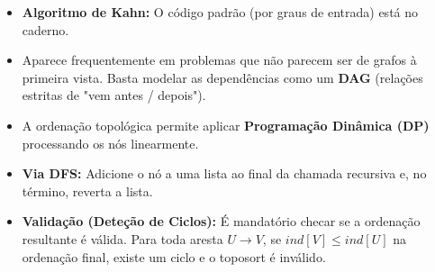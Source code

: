 \begin{itemize}
    \item \textbf{Algoritmo de Kahn:} O código padrão (por graus de entrada) está no caderno.
    \item Aparece frequentemente em problemas que não parecem ser de grafos à primeira vista. Basta modelar as dependências como um \textbf{DAG} (relações estritas de "vem antes / depois").
    \item A ordenação topológica permite aplicar \textbf{Programação Dinâmica (DP)} processando os nós linearmente.
    \item \textbf{Via DFS:} Adicione o nó a uma lista ao final da chamada recursiva e, no término, reverta a lista.
    \item \textbf{Validação (Deteção de Ciclos):} É mandatório checar se a ordenação resultante é válida. Para toda aresta $U \to V$, se $ind[V] \le ind[U]$ na ordenação final, existe um ciclo e o toposort é inválido.
\end{itemize}